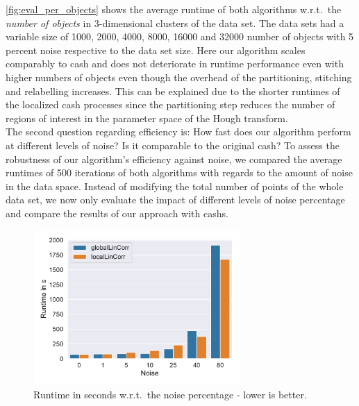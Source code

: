 \autoref{fig:eval_per_objects} shows the average runtime of both algorithms w.r.t.\ the \textit{number of objects} in 3-dimensional clusters of the data set. The data sets had a variable size of 1000, 2000, 4000, 8000, 16000 and 32000 number of objects with 5 percent noise respective to the data set size. Here our algorithm scales comparably to \gls{cash} and does not deteriorate in runtime performance even with higher numbers of objects even though the overhead of the partitioning, stitching and relabelling increases. This can be explained due to the shorter runtimes of the localized \gls{cash} processes since the partitioning step reduces the number of regions of interest in the parameter space of the Hough transform.\\

The second question regarding efficiency is: How fast does our algorithm perform at different levels of noise? Is it comparable to the original \gls{cash}? To assess the robustness of our algorithm's efficiency against noise, we compared the average runtimes of 500 iterations of both algorithms with regards to the amount of noise in the data space. Instead of modifying the total number of points of the whole data set, we now only evaluate the impact of different levels of noise percentage and compare the results of our approach with \gls{cash}s.


\begin{figure}[h]
    \centering
        \includegraphics[width=0.7\textwidth]{new_evaluation/per_noise/Avg_Runtime_3D_O10000_pnoise_bar.pdf}
    \caption{Runtime in seconds w.r.t.\ the noise percentage - lower is better.}
    \label{fig:eval_per_noise}
\end{figure}

